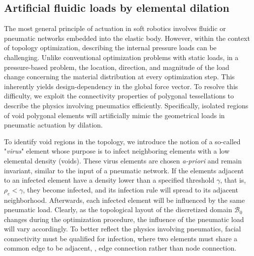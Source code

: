\subsection{Artificial fluidic loads by elemental dilation}
The most general principle of actuation in soft robotics involves fluidic or pneumatic networks embedded into the elastic body. However, within the context of topology optimization, describing the internal pressure loads can be challenging. Unlike conventional optimization problems with static loads, in a pressure-based problem, the location, direction, and magnitude of the load change concerning the material distribution at every optimization step. This inherently yields design-dependency in the global force vector. To resolve this difficulty, we exploit the connectivity properties of polygonal tessellations to describe the physics involving pneumatics efficiently. Specifically, isolated regions of void polygonal elements will artificially mimic the geometrical loads in pneumatic actuation by dilation.

To identify void regions in the topology, we introduce the notion of a so-called "\emph{virus}" element whose purpose is to infect neighboring elements with a low elemental density (voids). These virus elements are chosen \textit{a-priori} and remain invariant, similar to the input of a pneumatic network. If the elements adjacent to an infected element have a density lower than a specified threshold $\gamma$, that is, $\rho_e < \gamma$, they become infected, and its infection rule will spread to its adjacent neighborhood. Afterwards, each infected element will be influenced by the same pneumatic load. Clearly, as the topological layout of the discretized domain $\mathcal{B}_0$ changes during the optimization procedure, the influence of the pneumatic load will vary accordingly. To better reflect the physics involving pneumatics, facial connectivity must be qualified for infection, where two elements must share a common edge to be adjacent, \ie, edge connection rather than node connection.


